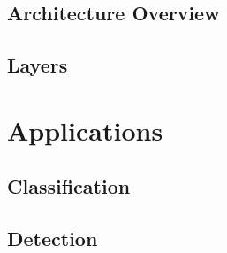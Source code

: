 \subsection{Architecture Overview}

\subsection{Layers}

\section{Applications}

\subsection{Classification}

\subsection{Detection}


\newpage
